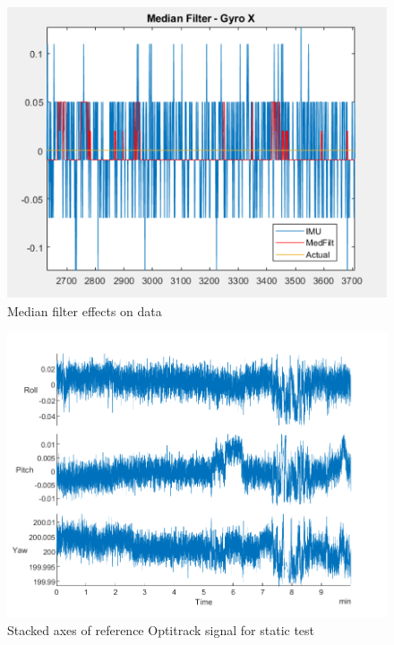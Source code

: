 \begin{figure}[H]
  \centering
  \includegraphics[scale=0.8]{graphics/median.png}
  \caption{Median filter effects on data}
  \label{fig:Median Filter}
\end{figure}


\begin{figure}[H]
    \centering
    \includegraphics[scale=1]{graphics/Navigation/StackedStaticOpti.png}
    \caption{Stacked axes of reference Optitrack signal for static test}
     \label{fig:Stacked axes of reference Optitrack signal for static test}
\end{figure} 


